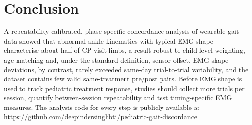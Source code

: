 \documentclass[conference]{IEEEtran}
\begin{document}
\section{Conclusion}
A repeatability-calibrated, phase-specific concordance analysis of wearable gait data showed that abnormal ankle kinematics with typical EMG shape characterise about half of CP visit-limbs, a result robust to child-level weighting, age matching and, under the standard definition, sensor offset. EMG shape deviations, by contrast, rarely exceeded same-day trial-to-trial variability, and the dataset contains few valid same-treatment pre/post pairs. Before EMG shape is used to track pediatric treatment response, studies should collect more trials per session, quantify between-session repeatability and test timing-specific EMG measures. The analysis code for every step is publicly available at \textcolor{red}{\url{https://github.com/deepindersinghbti/pediatric-gait-discordance}}. %
\end{document}
